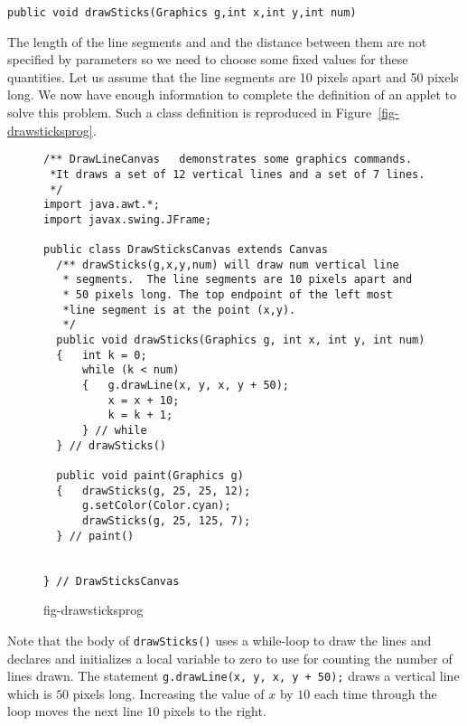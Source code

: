 \begin{jjjlisting}
\begin{lstlisting}
public void drawSticks(Graphics g,int x,int y,int num)
\end{lstlisting}
\end{jjjlisting}

The length of the line segments and and the distance between 
them are not specified by parameters so we need to choose some 
fixed values for these quantities. Let us assume that the line 
segments are 10 pixels apart and 50 pixels long. We now have 
enough information to complete the definition of an applet
to solve this problem. Such a class definition is reproduced in 
Figure~\ref{fig-drawsticksprog}.

\begin{figure}[htb]
\jjjprogstart
\begin{jjjlisting}
\begin{lstlisting}
/** DrawLineCanvas   demonstrates some graphics commands.
 *It draws a set of 12 vertical lines and a set of 7 lines.
 */
import java.awt.*;
import javax.swing.JFrame;

public class DrawSticksCanvas extends Canvas
  /** drawSticks(g,x,y,num) will draw num vertical line
   * segments.  The line segments are 10 pixels apart and
   * 50 pixels long. The top endpoint of the left most
   *line segment is at the point (x,y).
   */
  public void drawSticks(Graphics g, int x, int y, int num)
  {   int k = 0;
      while (k < num)
      {   g.drawLine(x, y, x, y + 50);
          x = x + 10;
          k = k + 1;
      } // while
  } // drawSticks()

  public void paint(Graphics g)
  {   drawSticks(g, 25, 25, 12);
      g.setColor(Color.cyan);
      drawSticks(g, 25, 125, 7);
  } // paint()

   
} // DrawSticksCanvas
\end{lstlisting}
\end{jjjlisting}
{fig-drawsticksprog}
\end{figure}

Note that the body of {\tt drawSticks()} uses a while-loop to draw the lines
and declares and initializes a local variable to zero to use for counting
the number of lines drawn.  The statement {\tt g.drawLine(x, y, x, y + 50);}
draws a vertical line which is $50$ pixels long.  Increasing the value of 
$x$ by $10$ each time through the loop moves the next line $10$ pixels to the right.

